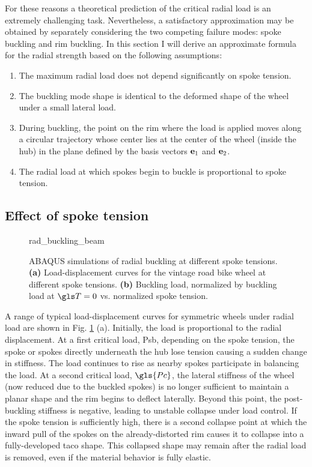 \documentclass[\rootdir/thesis.tex]{subfiles}
\begin{document}
For these reasons a theoretical prediction of the critical radial load is an extremely challenging task. Nevertheless, a satisfactory approximation may be obtained by separately considering the two competing failure modes: spoke buckling and rim buckling. In this section I will derive an approximate formula for the radial strength based on the following assumptions:

\begin{enumerate}
\item{The maximum radial load does not depend significantly on spoke tension.}\label{assum:no_T_effect}
\item{The buckling mode shape is identical to the deformed shape of the wheel under a small lateral load.}\label{assum:lat_shape}
\item{During buckling, the point on the rim where the load is applied moves along a circular trajectory whose center lies at the center of the wheel (inside the hub) in the plane defined by the basis vectors $\mathbf{e}_1$ and $\mathbf{e}_2$.}\label{assum:circ_path}
\item{The radial load at which spokes begin to buckle is proportional to spoke tension.}\label{assum:Psb_T}
\end{enumerate}

\subsection{Effect of spoke tension}

\begin{figure}[t]
\centering
{rad_buckling_beam}
\caption{ABAQUS simulations of radial buckling at different spoke tensions. \textbf{(a)} Load-displacement curves for the vintage road bike wheel at different spoke tensions. \textbf{(b)} Buckling load, normalized by buckling load at $\T=0$ vs. normalized spoke tension.}
\label{fig:rad_buckling_beam}
\end{figure}

A range of typical load-displacement curves for symmetric wheels under radial load are shown in Fig. \ref{fig:rad_buckling_beam} (a). Initially, the load is proportional to the radial displacement. At a first critical load, \gls{Psb}, depending on the spoke tension, the spoke or spokes directly underneath the hub lose tension causing a sudden change in stiffness. The load continues to rise as nearby spokes participate in balancing the load. At a second critical load, $\gls{Pc}$, the lateral stiffness of the wheel (now reduced due to the buckled spokes) is no longer sufficient to maintain a planar shape and the rim begins to deflect laterally. Beyond this point, the post-buckling stiffness is negative, leading to unstable collapse under load control. If the spoke tension is sufficiently high, there is a second collapse point at which the inward pull of the spokes on the already-distorted rim causes it to collapse into a fully-developed taco shape. This collapsed shape may remain after the radial load is removed, even if the material behavior is fully elastic.
\end{document}

